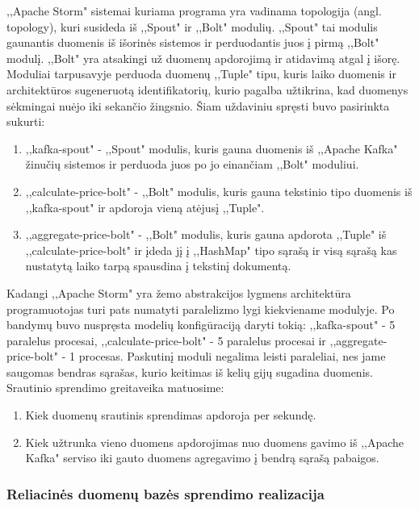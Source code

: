 \documentclass{VUMIFPSkursinis}
\begin{document}
,,Apache Storm" sistemai kuriama programa yra vadinama topologija (angl. topology), kuri susideda iš ,,Spout" ir ,,Bolt" modulių. ,,Spout" tai modulis gaunantis duomenis
iš išorinės sistemos ir perduodantis juos į pirmą ,,Bolt" modulį. ,,Bolt" yra atsakingi už duomenų apdorojimą ir atidavimą atgal į išorę.
Moduliai tarpusavyje perduoda duomenų ,,Tuple" tipu, kuris laiko duomenis ir architektūros sugeneruotą identifikatorių, 
kurio pagalba užtikrina, kad duomenys sėkmingai nuėjo iki sekančio žingsnio. 
Šiam uždaviniu spręsti buvo pasirinkta sukurti:
\begin{enumerate}
    \item ,,kafka-spout" - ,,Spout" modulis, kuris gauna duomenis iš ,,Apache Kafka" žinučių sistemos ir perduoda juos po jo einančiam ,,Bolt" moduliui.
    \item ,,calculate-price-bolt" - ,,Bolt" modulis, kuris gauna tekstinio tipo duomenis iš ,,kafka-spout" ir apdoroja vieną atėjusį ,,Tuple".
    \item ,,aggregate-price-bolt" - ,,Bolt" modulis, kuris gauna apdorota ,,Tuple" iš ,,calculate-price-bolt" ir įdeda jį į ,,HashMap" tipo sąrašą ir visą sąrašą kas nustatytą laiko tarpą spausdina į tekstinį dokumentą.  
\end{enumerate}\par
Kadangi ,,Apache Storm" yra žemo abstrakcijos lygmens architektūra programuotojas turi pats numatyti paralelizmo lygi kiekviename modulyje. 
Po bandymų buvo nuspręsta modelių konfigūraciją daryti tokią: ,,kafka-spout" - 5 paralelus procesai, ,,calculate-price-bolt"
 - 5 paralelus procesai ir ,,aggregate-price-bolt" - 1 procesas. Paskutinį moduli negalima leisti paraleliai, nes jame saugomas bendras sąrašas,
kurio keitimas iš kelių gijų sugadina duomenis. Srautinio sprendimo greitaveika matuosime:
\begin{enumerate}
    \item Kiek duomenų srautinis sprendimas apdoroja per sekundę.
    \item Kiek užtrunka vieno duomens apdorojimas nuo duomens gavimo iš ,,Apache Kafka" serviso iki gauto duomens agregavimo į bendrą sąrašą pabaigos.
\end{enumerate}

 \subsubsection{Reliacinės duomenų bazės sprendimo realizacija}
\end{document}
